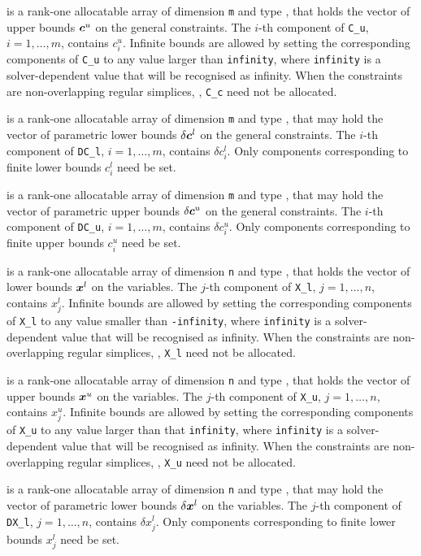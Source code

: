 \documentclass{galahad}
\begin{document}
\begin{description}
 is a rank-one allocatable array of dimension {\tt m} and type
\realdp, that holds the vector of upper bounds ${\bm{c}}^{u}$
on the general constraints. The $i$-th component of
{\tt C\_u}, $i = 1,  \ldots ,  m$, contains $c_{i}^{u}$.
Infinite bounds are allowed by setting the corresponding
components of {\tt C\_u} to any value larger than {\tt infinity},
where {\tt infinity} is a  solver-dependent value that will be recognised as
infinity.
When the constraints are non-overlapping regular simplices, ,
{\tt C\_c} need not be allocated.

 is a rank-one allocatable array of dimension {\tt m} and type
\realdp, that may hold the vector of parametric lower bounds
$\delta {\bm{c}}^{l}$ on the general constraints. The $i$-th component of
{\tt DC\_l}, $i = 1, \ldots , m$, contains $\delta c_{i}^{l}$.
Only components corresponding to finite lower bounds $c_{i}^{l}$
need be set.

 is a rank-one allocatable array of dimension {\tt m} and type
\realdp, that may hold the vector of parametric upper bounds
$\delta {\bm{c}}^{u}$  on the general constraints. The $i$-th component of
{\tt DC\_u}, $i = 1,  \ldots ,  m$, contains $\delta c_{i}^{u}$.
Only components corresponding to finite upper bounds $c_{i}^{u}$
need be set.

 is a rank-one allocatable array of dimension {\tt n} and type
\realdp, that holds
the vector of lower bounds ${\bm{x}}^{l}$ on the variables.
The $j$-th component of {\tt X\_l}, $j = 1, \ldots , n$,
contains $x_{j}^{l}$.
Infinite bounds are allowed by setting the corresponding
components of {\tt X\_l} to any value smaller than {\tt -infinity},
where {\tt infinity} is a  solver-dependent value that will be recognised as
infinity.
When the constraints are non-overlapping regular simplices, ,
{\tt X\_l} need not be allocated.

 is a rank-one allocatable array of dimension {\tt n} and type
\realdp, that holds
the vector of upper bounds ${\bm{x}}^{u}$ on the variables.
The $j$-th component of {\tt X\_u}, $j = 1, \ldots , n$,
contains $x_{j}^{u}$.
Infinite bounds are allowed by setting the corresponding
components of {\tt X\_u} to any value larger than that {\tt infinity},
where {\tt infinity} is a  solver-dependent value that will be recognised as
infinity.
When the constraints are non-overlapping regular simplices, ,
{\tt X\_u} need not be allocated.

 is a rank-one allocatable array of dimension {\tt n} and type
\realdp, that may hold the vector of parametric lower bounds
$\delta {\bm{x}}^{l}$ on the variables. The $j$-th component of
{\tt DX\_l}, $j = 1, \ldots , n$, contains $\delta x_{j}^{l}$.
Only components corresponding to finite lower bounds $x_{j}^{l}$
need be set.


\end{description}
\end{document}
